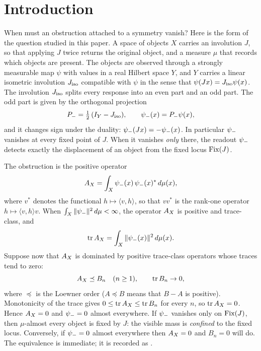 \section{Introduction}
\label{sec:intro}

When must an obstruction attached to a symmetry vanish?  Here is the
form of the question studied in this paper.  A space of objects \(X\)
carries an involution \(J\), so that applying \(J\) twice returns the
original object, and a measure \(\mu\) that records which objects are
present.  The objects are observed through a strongly measurable map
\(\psi\) with values in a real Hilbert space \(Y\), and \(Y\) carries a
linear isometric involution \(J_{\mathrm{iso}}\) compatible with \(\psi\) in the
sense that \(\psi(Jx)=J_{\mathrm{iso}}\psi(x)\).  The involution \(J_{\mathrm{iso}}\) splits every
response into an even part and an odd part.  The odd part is given by
the orthogonal projection
\[
  P_{-}=\tfrac12\,(I_Y-J_{\mathrm{iso}}),
  \qquad
  \psi_{-}(x)=P_{-}\psi(x),
\]
and it changes sign under the duality: \(\psi_{-}(Jx)=-\psi_{-}(x)\).  In
particular \(\psi_{-}\) vanishes at every fixed point of \(J\).  When it
vanishes \emph{only} there, the readout \(\psi_{-}\) detects exactly
the displacement of an object from the fixed locus \(\operatorname{Fix}(J)\).

The obstruction is the positive operator
\[
  A_{X}=\int_X \psi_{-}(x)\,\psi_{-}(x)^*\,d\mu(x),
\]
where \(v^*\) denotes the functional \(h\mapsto\langle v,h\rangle\),
so that \(vv^*\) is the rank-one operator
\(h\mapsto\langle v,h\rangle v\).  When
\(\int_X\|\psi_{-}\|^2\,d\mu<\infty\), the operator \(A_{X}\) is positive
and trace-class, and
\[
  \operatorname{tr}A_{X}=\int_X\|\psi_{-}(x)\|^2\,d\mu(x).
\]
Suppose now that \(A_{X}\) is dominated by positive trace-class
operators whose traces tend to zero:
\[
  A_{X}\preceq B_n\quad(n\geq1),
  \qquad
  \operatorname{tr} B_n\to0,
\]
where \(\preceq\) is the Loewner order (\(A\preceq B\) means that
\(B-A\) is positive).  Monotonicity of the trace gives
\(0\leq\operatorname{tr}A_{X}\leq\operatorname{tr} B_n\) for every \(n\), so
\(\operatorname{tr}A_{X}=0\).  Hence \(A_{X}=0\) and \(\psi_{-}=0\) almost everywhere.
If \(\psi_{-}\) vanishes only on \(\operatorname{Fix}(J)\), then \(\mu\)-almost every
object is fixed by \(J\): the visible mass is \emph{confined} to the
fixed locus.  Conversely, if \(\psi_{-}=0\) almost everywhere then
\(A_{X}=0\) and \(B_n=0\) will do.  The equivalence is immediate; it is
recorded as .

